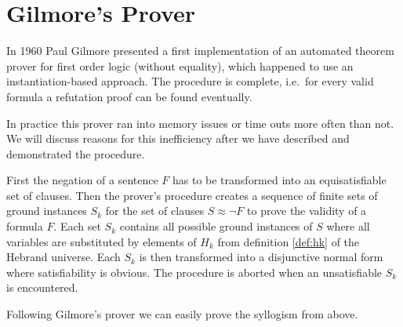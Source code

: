 \section{Gilmore's Prover}

In 1960 Paul Gilmore presented a first {\myem implementation} of an automated 
theorem prover \cite{5392528} for first order logic (without equality),
which happened to use an instantiation-based approach. 
The procedure is complete, i.e.~for every valid formula 
a refutation proof can be found eventually.

In practice this prover ran into memory issues or time outs more often than not.
We will discuss reasons for this inefficiency after we have described and demonstrated the procedure.

First the negation of a sentence $F$ has to be transformed into an equisatisfiable set of clauses.
Then the prover's procedure 
creates a sequence of finite sets of ground instances $S_k$ 
for the set of clauses $S\approx\lnot F$ to prove the validity of a formula $F$.
Each set $S_k$ contains all possible ground instances of $S$ 
where all variables are substituted by elements of $H_k$
from definition \ref{def:hk} of the Hebrand universe.
Each $S_k$ is then transformed into a disjunctive normal form where satisfiability is obvious.
The procedure is aborted when an unsatisfiable $S_k$ is encountered.

Following Gilmore's prover we can easily prove the syllogism from above.

